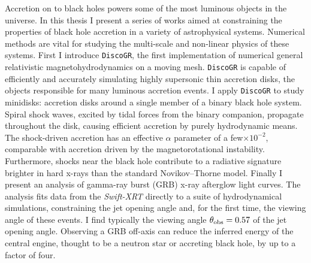 Accretion on to black holes powers some of the most luminous objects in the universe. In this thesis I present a series of works aimed at constraining the properties of black hole accretion in a variety of astrophysical systems.  Numerical methods are vital for studying the multi-scale and non-linear physics of these systems. First I introduce {\tt DiscoGR}, the first implementation of numerical general relativistic magnetohydrodynamics on a moving mesh.  {\tt DiscoGR} is capable of efficiently and accurately simulating highly supersonic thin accretion disks, the objects responsible for many luminous accretion events.  I apply {\tt DiscoGR} to study minidisks: accretion disks around a single member of a binary black hole system.  Spiral shock waves, excited by tidal forces from the binary companion, propagate throughout the disk, causing efficient accretion by purely hydrodynamic means. The shock-driven accretion has an effective $\alpha$ parameter of a few$\times10^{-2}$, comparable with accretion driven by the magnetorotational instability.  Furthermore, shocks near the black hole contribute to a radiative signature brighter in hard x-rays than the standard Novikov--Thorne model.  Finally I present an analysis of gamma-ray burst (GRB) x-ray afterglow light curves. The analysis fits data from the \emph{Swift-XRT} directly to a suite of hydrodynamical simulations, constraining the jet opening angle and, for the first time, the viewing angle of these events.  I find typically the viewing angle $\theta_{\rm obs} = 0.57$ of the jet opening angle.  Observing a GRB off-axis can reduce the inferred energy of the central engine, thought to be a neutron star or accreting black hole, by up to a factor of four.


